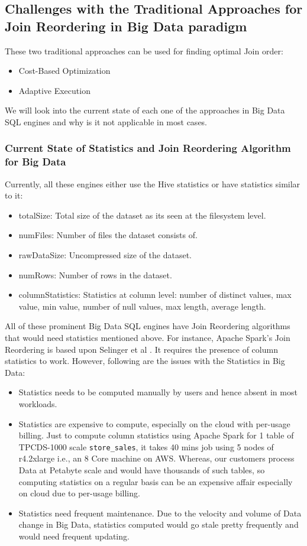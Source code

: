 \subsection{Challenges with the Traditional Approaches for Join Reordering in Big Data paradigm}
These two traditional approaches can be used for finding optimal Join order:
\begin{itemize}
\item Cost-Based Optimization
\item Adaptive Execution
\end{itemize}

We will look into the current state of each one of the approaches in Big Data SQL engines and why is it not applicable in most cases.

\subsubsection{Current State of Statistics and Join Reordering Algorithm for Big Data}

Currently, all these engines either use the Hive statistics or have statistics similar to it:
\begin{itemize}
\item totalSize: Total size of the dataset as its seen at the filesystem level.
\item numFiles: Number of files the dataset consists of.
\item rawDataSize: Uncompressed size of the dataset.
\item numRows: Number of rows in the dataset.
\item columnStatistics: Statistics at column level: number of distinct values, max value, min value, number of null values, max length, average length.
\end{itemize}

All of these prominent Big Data SQL engines have Join Reordering algorithms that would need statistics mentioned above. For instance, Apache Spark's Join Reordering is based upon Selinger et al \cite{b1}. It requires the presence of column statistics to work. However, following are the issues with the Statistics in Big Data:

\begin{itemize}
\item Statistics needs to be computed manually by users and hence absent in most workloads.
\item Statistics are expensive to compute, especially on the cloud with per-usage billing. Just to compute column statistics using Apache Spark for 1 table of TPCDS-1000 scale \texttt{store\_sales}, it takes 40 mins job using 5 nodes of r4.2xlarge i.e., an 8 Core machine on AWS. Whereas, our customers process Data at Petabyte scale and would have thousands of such tables, so computing statistics on a regular basis can be an expensive affair especially on cloud due to per-usage billing.
\item Statistics need frequent maintenance. Due to the velocity and volume of Data change in Big Data, statistics computed would go stale pretty frequently and would need frequent updating.
\end{itemize}

